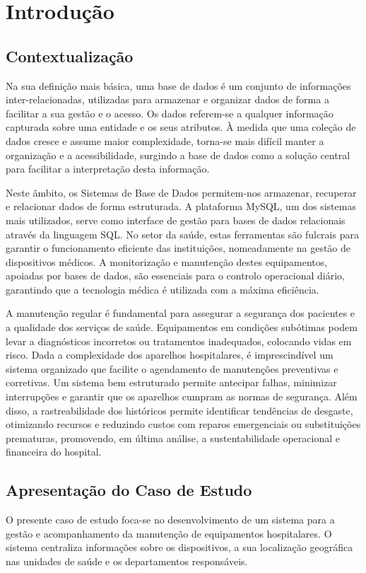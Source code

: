 \chapter{ Introdução}
\section{ Contextualização}
Na sua definição mais básica, uma base de dados é um conjunto de informações inter-relacionadas, utilizadas para armazenar e organizar dados de forma a facilitar a sua gestão e o acesso. Os dados referem-se a qualquer informação capturada sobre uma entidade e os seus atributos. À medida que uma coleção de dados cresce e assume maior complexidade, torna-se mais difícil manter a organização e a acessibilidade, surgindo a base de dados como a solução central para facilitar a interpretação desta informação.

Neste âmbito, os Sistemas de Base de Dados permitem-nos armazenar, recuperar e relacionar dados de forma estruturada. A plataforma MySQL, um dos sistemas mais utilizados, serve como interface de gestão para bases de dados relacionais através da linguagem SQL. No setor da saúde, estas ferramentas são fulcrais para garantir o funcionamento eficiente das instituições, nomeadamente na gestão de dispositivos médicos. A monitorização e manutenção destes equipamentos, apoiadas por bases de dados, são essenciais para o controlo operacional diário, garantindo que a tecnologia médica é utilizada com a máxima eficiência.

A manutenção regular é fundamental para assegurar a segurança dos pacientes e a qualidade dos serviços de saúde. Equipamentos em condições subótimas podem levar a diagnósticos incorretos ou tratamentos inadequados, colocando vidas em risco. Dada a complexidade dos aparelhos hospitalares, é imprescindível um sistema organizado que facilite o agendamento de manutenções preventivas e corretivas. Um sistema bem estruturado permite antecipar falhas, minimizar interrupções e garantir que os aparelhos cumpram as normas de segurança. Além disso, a rastreabilidade dos históricos permite identificar tendências de desgaste, otimizando recursos e reduzindo custos com reparos emergenciais ou substituições prematuras, promovendo, em última análise, a sustentabilidade operacional e financeira do hospital.

\newpage
\section{ Apresentação do Caso de Estudo}
O presente caso de estudo foca-se no desenvolvimento de um sistema para a gestão e acompanhamento da manutenção de equipamentos hospitalares. O sistema centraliza informações sobre os dispositivos, a sua localização geográfica nas unidades de saúde e os departamentos responsáveis.

